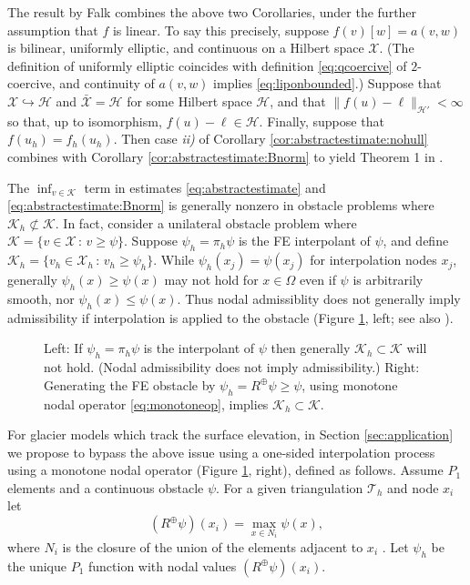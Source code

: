 \documentclass[hidelinks,onefignum,onetabnum,final]{siamart220329}  %
\newcommand{\cH}{\mathcal{H}}
\newcommand{\cK}{\mathcal{K}}
\newcommand{\cT}{\mathcal{T}}
\newcommand{\cX}{\mathcal{X}}
\begin{document}
The result by Falk \cite{Falk1974} combines the above two Corollaries, under the further assumption that $f$ is linear.  To say this precisely, suppose $f(v)[w]=a(v,w)$ is bilinear, uniformly elliptic, and continuous on a Hilbert space $\cX$.  (The definition of uniformly elliptic coincides with definition \eqref{eq:qcoercive} of $2$-coercive, and continuity of $a(v,w)$ implies \eqref{eq:liponbounded}.)  Suppose that $\cX\hookrightarrow \cH$ and $\bar{\cX} = \cH$ for some Hilbert space $\cH$, and that $\|f(u)-\ell\|_{\cH'} < \infty$ so that, up to isomorphism, $f(u)-\ell \in \cH$.  Finally, suppose that $f(u_h)=f_h(u_h)$.  Then case \emph{ii)} of Corollary \ref{cor:abstractestimate:nohull} combines with Corollary \ref{cor:abstractestimate:Bnorm} to yield Theorem 1 in \cite{Falk1974}.

The $\inf_{v\in\cK}$ term in estimates \eqref{eq:abstractestimate} and \eqref{eq:abstractestimate:Bnorm} is generally nonzero in obstacle problems where $\cK_h \not\subset \cK$.  In fact, consider a unilateral obstacle problem where $\cK=\{v \in \cX\,:\,v\ge \psi\}$.  Suppose $\psi_h=\pi_h \psi$ is the FE interpolant of $\psi$, and define $\cK_h=\{v_h \in \cX_h\,:\,v_h\ge \psi_h\}$.  While $\psi_h(x_j)=\psi(x_j)$ for interpolation nodes $x_j$, generally $\psi_h(x) \ge \psi(x)$ may not hold for $x\in\Omega$ even if $\psi$ is arbitrarily smooth, nor $\psi_h(x) \le \psi(x)$.  Thus nodal admissiblity does not generally imply admissibility if interpolation is applied to the obstacle (Figure \ref{fig:nonadmissible}, left; see also \cite[Figure 5.1.3]{Ciarlet2002}).

\begin{figure}[ht]
\begin{center}
 \quad 
\end{center}
\caption{Left: If $\psi_h=\pi_h\psi$ is the interpolant of $\psi$ then generally $\cK_h\subset\cK$ will not hold.  (Nodal admissibility does not imply admissibility.)  Right: Generating the FE obstacle by $\psi_h=R^{\oplus} \psi \ge \psi$, using monotone nodal operator \eqref{eq:monotoneop}, implies $\cK_h\subset\cK$.}
\label{fig:nonadmissible}
\end{figure}

For glacier models which track the surface elevation, in Section \ref{sec:application} we propose to bypass the above issue using a one-sided interpolation process using a monotone nodal operator (Figure \ref{fig:nonadmissible}, right), defined as follows.  Assume $P_1$ elements and a continuous obstacle $\psi$.  For a given triangulation $\cT_h$ and node $x_i$ let
\begin{equation}
(R^{\oplus}\psi)(x_i) = \max_{x \in N_i} \psi(x), \label{eq:monotoneop}
\end{equation}
where $N_i$ is the closure of the union of the elements adjacent to $x_i$ \cite{BuelerFarrell2024}.  Let $\psi_h$ be the unique $P_1$ function with nodal values $(R^{\oplus}\psi)(x_i)$.
\end{document}
